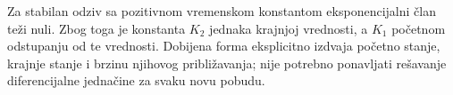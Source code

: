 Za stabilan odziv sa pozitivnom vremenskom konstantom eksponencijalni član teži nuli. Zbog toga je konstanta $K_2$ jednaka krajnjoj vrednosti, a $K_1$ početnom odstupanju od te vrednosti. Dobijena forma eksplicitno izdvaja početno stanje, krajnje stanje i brzinu njihovog približavanja; nije potrebno ponavljati rešavanje diferencijalne jednačine za svaku novu pobudu.
